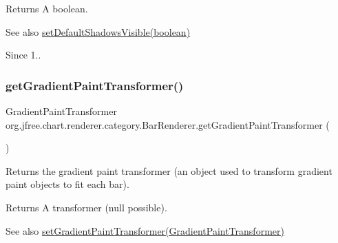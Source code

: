 \begin{DoxyReturn}{Returns}
A boolean.
\end{DoxyReturn}
\begin{DoxySeeAlso}{See also}
\mbox{\hyperlink{classorg_1_1jfree_1_1chart_1_1renderer_1_1category_1_1_bar_renderer_a32e4bfa8e107485211713f9543c48302}{set\+Default\+Shadows\+Visible(boolean)}}
\end{DoxySeeAlso}
\begin{DoxySince}{Since}
1.. 
\end{DoxySince}
\mbox{\label{classorg_1_1jfree_1_1chart_1_1renderer_1_1category_1_1_bar_renderer_a4f1742f14bcdfcd92b36694668f85ee6}} 
\subsubsection{\texorpdfstring{get\+Gradient\+Paint\+Transformer()}{getGradientPaintTransformer()}}
{\footnotesize\ttfamily Gradient\+Paint\+Transformer org.\+jfree.\+chart.\+renderer.\+category.\+Bar\+Renderer.\+get\+Gradient\+Paint\+Transformer (\begin{DoxyParamCaption}{ }\end{DoxyParamCaption})}

Returns the gradient paint transformer (an object used to transform gradient paint objects to fit each bar).

\begin{DoxyReturn}{Returns}
A transformer ({\ttfamily null} possible).
\end{DoxyReturn}
\begin{DoxySeeAlso}{See also}
\mbox{\hyperlink{classorg_1_1jfree_1_1chart_1_1renderer_1_1category_1_1_bar_renderer_a002489c071cec14df64cb013f3548444}{set\+Gradient\+Paint\+Transformer(\+Gradient\+Paint\+Transformer)}} 
\end{DoxySeeAlso}
\mbox{\label{classorg_1_1jfree_1_1chart_1_1renderer_1_1category_1_1_bar_renderer_a2a651216a3c24be67f109d7bb02c3a7c}} 
